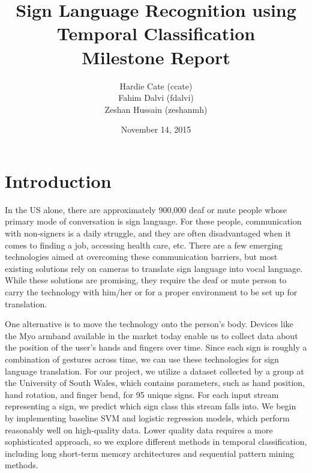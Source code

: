 \documentclass[twocolumn]{article}
\title{Sign Language Recognition using Temporal Classification \\ Milestone Report}
\author{Hardie Cate (ccate)\\ Fahim Dalvi (fdalvi) \\ Zeshan Hussain (zeshanmh)}
\date{November 14, 2015}
\begin{document}
\maketitle

\section{Introduction}
In the US alone, there are approximately 900,000 deaf or mute people whose primary mode of conversation is sign language. 
For these people, communication with non-signers is a daily struggle, and they are often disadvantaged when it comes to finding a job, accessing health care, etc.
There are a few emerging technologies aimed at overcoming these communication barriers, but most existing solutions rely on cameras to translate sign language into vocal language.
While these solutions are promising, they require the deaf or mute person to carry the technology with him/her or for a proper environment to be set up for translation.

One alternative is to move the technology onto the person’s body.
Devices like the Myo armband available in the market today enable us to collect data about the position of the user's hands and fingers over time.
Since each sign is roughly a combination of gestures across time, we can use these technologies for sign language translation.
For our project, we utilize a dataset collected by a group at the University of South Wales, which contains parameters, such as hand position, hand rotation, and finger bend, for 95 unique signs.
For each input stream representing a sign, we predict which sign class this stream falls into.
We begin by implementing baseline SVM and logistic regression models, which perform reasonably well on high-quality data.
Lower quality data requires a more sophisticated approach, so we explore different methods in temporal classification, including long short-term memory architectures and sequential pattern mining methods. 
\end{document}
